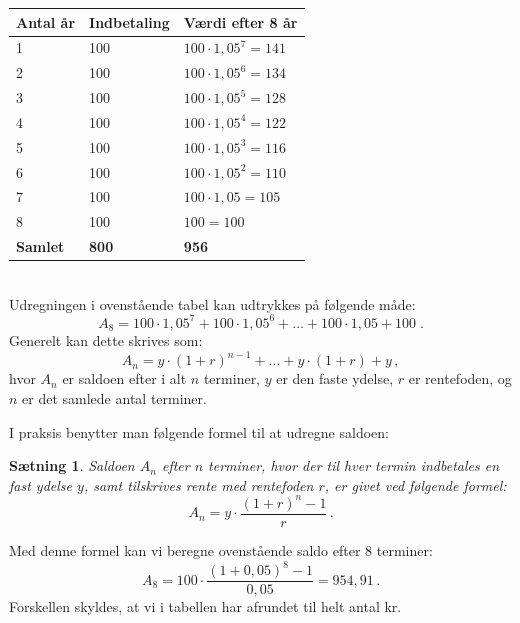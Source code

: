 \documentclass[12pt,oneside,a4paper]{article}
\newtheorem{thm}{Sætning}[section]
\begin{document}
\begin{tabular}{|l|l|l|}
    \hline
    \textbf{Antal år} & \textbf{Indbetaling} & \textbf{Værdi efter 8 år} \\
    \hline
    1 & 100 & $100 \cdot 1,05^7 = 141$ \\
    \hline
    2 & 100 & $100 \cdot 1,05^6 = 134$ \\
    \hline
    3 & 100 & $100 \cdot 1,05^5 = 128$ \\
    \hline
    4 & 100 & $100 \cdot 1,05^4 = 122$ \\
    \hline
    5 & 100 & $100 \cdot 1,05^3 = 116$ \\
    \hline
    6 & 100 & $100 \cdot 1,05^2 = 110$ \\
    \hline
    7 & 100 & $100 \cdot 1,05 = 105$ \\
    \hline
    8 & 100 & $100 = 100$ \\
    \hline
    \textbf{Samlet} & \textbf{800} & \textbf{956} \\
    \hline
\end{tabular}
\\

Udregningen i ovenstående tabel kan udtrykkes på følgende måde:
\[
A_8 = 100\cdot 1,05^7 + 100 \cdot 1,05^6 + \ldots + 100 \cdot 1,05 + 100 \;.
\]
Generelt kan dette skrives som:
\[
A_n = y\cdot(1+r)^{n-1} + \ldots + y\cdot(1+r) + y \,,
\]
hvor $A_n$ er saldoen efter i alt $n$ terminer,  $y$ er den faste
ydelse, $r$ er rentefoden, og $n$ er det samlede antal terminer.

I praksis benytter man følgende formel til at udregne saldoen:
\begin{tcolorbox}
\begin{thm}
Saldoen $A_n$ efter $n$ terminer, hvor der til hver termin indbetales en fast ydelse $y$,
samt tilskrives rente med rentefoden $r$, er givet ved følgende formel:
\[
A_n = y\cdot\frac{(1+r)^n-1}{r}\,.
\]
\end{thm}
\end{tcolorbox}

Med denne formel kan vi beregne ovenstående saldo efter 8 terminer:
\[
A_8 = 100\cdot\frac{(1+0,05)^8-1}{0,05} = 954,91 \,.
\]
Forskellen skyldes, at vi i tabellen har afrundet til helt antal kr.
\end{document}
